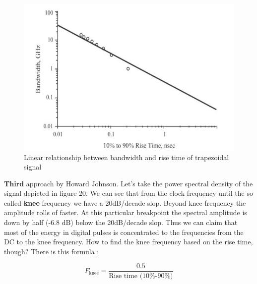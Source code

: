\documentclass[final]{cubedoc}
\begin{document}
	\begin{figure}[h!]
		\centering
		\includegraphics[keepaspectratio, width = \textwidth, height = .3\textheight]{assets/band_rise.png}
		\caption{Linear relationship between bandwidth and rise time of trapezoidal signal \cite{bogatin2009signal}}
	\end{figure}
	
	
	\textbf{Third} approach by Howard Johnson. Let's take the power spectral density of the signal depicted in figure 20. We can see that from the clock frequency until the so called \textbf{knee} frequency we have a 20dB/decade slop. Beyond knee frequency the amplitude rolls of faster. At this particular breakpoint the spectral amplitude is down by half (-6.8 dB) below the 20dB/decade slop. Thus we can claim that most of the energy in digital pulses is concentrated to the frequencies from the DC to the knee frequency. How to find the knee frequency based on the rise time, though? There is this formula \cite{johnson2003high}:
	
	\[F_\text{knee} = \frac{0.5}{\text{Rise time (10\%-90\%)}}\] 
	
\end{document}
